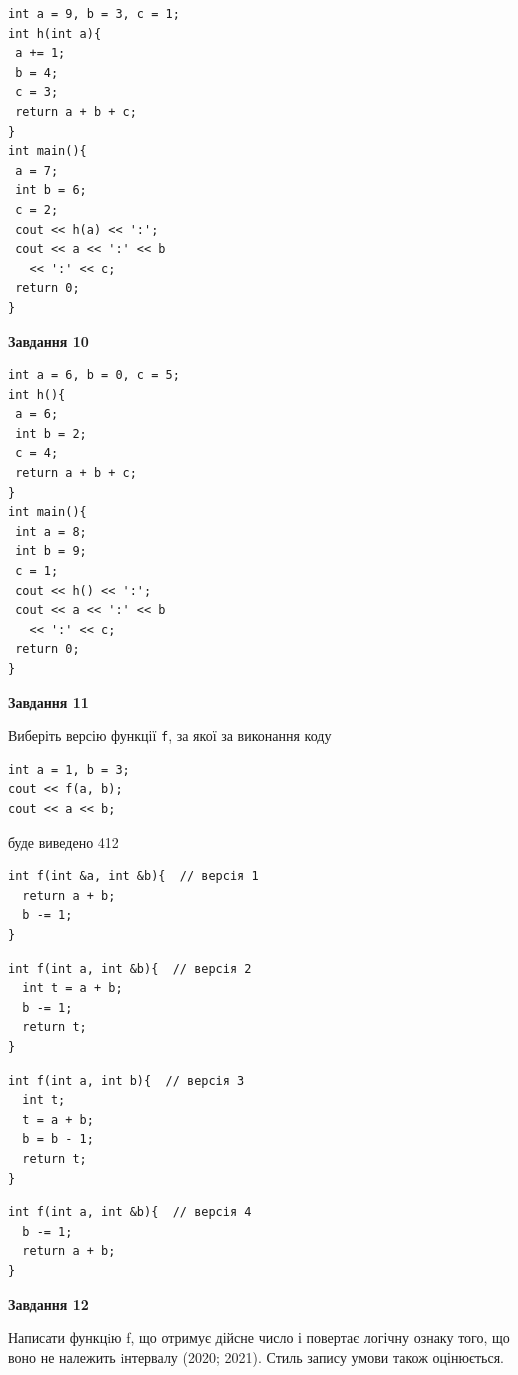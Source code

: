 \documentclass[12pt, ukrainian]{article}
\def\code#1{\Verb!#1!}
\begin{document}
{\begin {large}
\begin{minipage}[t]{7.0cm}
\begin{verbatim}
int a = 9, b = 3, c = 1;
int h(int a){
 a += 1;
 b = 4;
 c = 3;
 return a + b + c;
}
int main(){
 a = 7;
 int b = 6;
 c = 2;
 cout << h(a) << ':';
 cout << a << ':' << b 
   << ':' << c;
 return 0;
}
\end{verbatim}



\begin{center}
\textbf{Завдання 10}
\end{center}
\vspace{-8mm}

\begin{verbatim}
int a = 6, b = 0, c = 5;
int h(){
 a = 6;
 int b = 2;
 c = 4;
 return a + b + c;
}
int main(){
 int a = 8;
 int b = 9;
 c = 1;
 cout << h() << ':';
 cout << a << ':' << b 
   << ':' << c;
 return 0;
}
\end{verbatim}

\end{minipage}
\vline \hspace{1mm}
\begin{minipage}[t]{11.0cm}

\begin{center}
\textbf{Завдання 11}
\end{center}
Виберіть версію функції \code{f}, за якої за виконання коду
\begin{verbatim}
int a = 1, b = 3;
cout << f(a, b);
cout << a << b;
\end{verbatim}

буде виведено 412

\begin{verbatim}
int f(int &a, int &b){  // версія 1
  return a + b;
  b -= 1;
}
\end{verbatim}

\vspace{-8mm}\begin{verbatim}
int f(int a, int &b){  // версія 2
  int t = a + b;
  b -= 1;
  return t;
}
\end{verbatim}

\vspace{-8mm}\begin{verbatim}
int f(int a, int b){  // версія 3
  int t;
  t = a + b;
  b = b - 1;
  return t;
}
\end{verbatim}

\vspace{-8mm}\begin{verbatim}
int f(int a, int &b){  // версія 4
  b -= 1;
  return a + b;
}
\end{verbatim}



\begin{center}
\textbf{Завдання 12}
\end{center}

Написати функцiю f, що отримує дійсне число і повертає логічну ознаку того, що воно не належить iнтервалу (2020; 2021). Стиль запису умови також оцінюється.\par

\end{minipage}

\end {large}}
\end{document}
